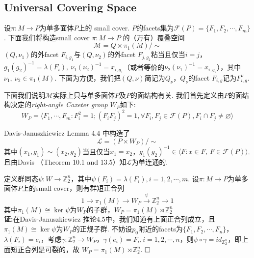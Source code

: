 \documentclass{article}
\theoremstyle{plain}%
\theoremstyle{definition}
\theoremstyle{remark}
\begin{document}
{\subsection{Universal Covering Space}
设$\pi:M\longrightarrow P$为单多面体$P$上的 small cover. $P$的facets集为$\mathcal{F}(P)=\{F_1,F_2,\cdots,F_m\}$.
下面我们将构造small cover $\pi:M\longrightarrow P$
的（万有）覆叠空间
\begin{equation}\label{eq5}
\mathcal{M}=Q\times \pi_1(M)/\sim
\end{equation}
$(Q,\nu_1)$的外facet $F_{i,g_1}$与$(Q,\nu_2)$的外facet $F_{j,g_2}$粘当且仅当$i=j$，$g_1(g_2)^{-1}=\lambda(F_i),~\nu_1(\nu_2)^{-1}=x_{i,g_1}$（或者等价的$\nu_2(\nu_1)^{-1}=x_{i,g_2}$），其中$\nu_1,~\nu_2\in \pi_1(M)$. 
下面为方便，我们把$(Q,\nu)$简记为$Q_{\nu}$，$Q_{\nu}$的facet $F_{i,g}$记为$F_{i,g}^{\nu}$. 

下面我们说明$\mathcal{M}$实际上只与单多面体$P$及$P$的面结构有关. 
我们首先定义由$P$的面结构决定的{\em right-angle Coxeter group $W_P$}如下:
$$W_P=\langle F_1,\cdots,F_m:F_i^2=1; (F_iF_j)^2=1, \forall F_i,F_j\in \mathcal{F}(P),F_i\cap F_j\neq \varnothing\rangle$$

Davis-Januszkiewicz \cite{DJ1} Lemma 4.4 中构造了
\begin{equation}\label{eq6}
\mathcal{L}=(P\times W_P)/\sim
\end{equation}
其中$(x_1,g_1)\sim (x_2,g_2)$当且仅当$x_1=x_2$，$g_1(g_2)^{-1}\in \langle F:x\in F,~F\in\mathcal{F}(P)\rangle$. 且由Davis \cite{D1}（Theorem 10.1 and 13.5）知$\mathcal{L}$为单连通的.

定义群同态$\psi:W\longrightarrow \mathbb{Z}_2^n$，其中$\psi(F_i)=\lambda(F_i), i=1,2,\cdots,m$.
{\lem \label{lem1}设$\pi:M\longrightarrow P$为单多面体$P$上的small cover，则有群短正合列
\begin{equation}\label{exact}
1 \longrightarrow \pi_1(M)\longrightarrow
W_P\overset{\psi}{\longrightarrow}\mathbb{Z}_2^n \longrightarrow  1
\end{equation}
其中$\pi_1(M)\cong \ker\psi$为$W_P$的子群，$W_P=\pi_1(M)\rtimes \mathbb{Z}_2^n$}\\
{\bf 证:}在Davis-Januszkiewicz \cite{DJ1}推论4.5中，我们知道有上面正合列成立，且$\pi_1(M)\cong \ker \psi$为$W_P$的正规子群. 不妨设$p_0$附近的facets为$\{F_1,F_2,\cdots,F_n\}$，$\lambda(F_i)=e_i$，考虑$\gamma:\mathbb{Z}_2^n\longrightarrow W_P$，$\gamma(e_i)=F_i, i=1,2,\cdots,n$，则$\psi\circ\gamma=id_{\mathbb{Z}_2^n}$，即上面短正合列是可裂的，故 $W_P=\pi_1(M)\rtimes \mathbb{Z}_2^n$.  $\hfill{} \Box$

}
\end{document}
